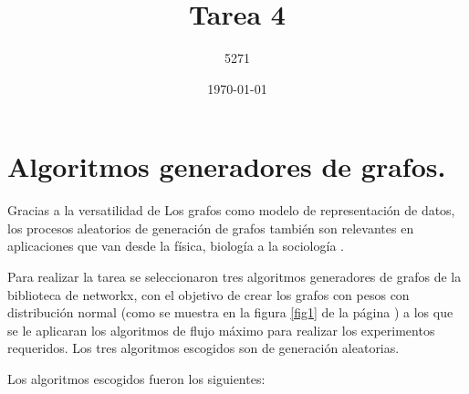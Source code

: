\documentclass{article}
\title{Tarea 4}
\author{5271}
\date{\today}
\begin{document}
\maketitle

\section{Algoritmos generadores de grafos.}

Gracias a la versatilidad de Los grafos como modelo de representación de datos, los procesos aleatorios de generación de grafos también son relevantes en aplicaciones que van desde la física, biología a la sociología \cite{Nobari} .

Para realizar la tarea se seleccionaron tres algoritmos generadores de grafos de la biblioteca de networkx, con el objetivo de crear los grafos con pesos con distribución normal (como se muestra en la figura \ref{fig1} de la página \pageref{fig1}) a los que se le aplicaran los algoritmos de flujo máximo para realizar los experimentos requeridos. Los tres algoritmos escogidos son de generación aleatorias.
 
Los algoritmos escogidos fueron los siguientes:
\end{document}
